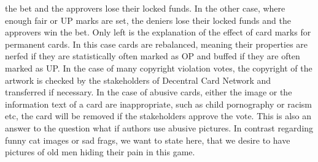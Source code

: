 \documentclass{article}
\begin{document}
the bet and the approvers lose their locked funds. In the other case, where enough fair or UP marks are set, the deniers lose their locked funds and the approvers win the bet. Only left is the explanation of the effect of card marks for permanent cards. In this case cards are rebalanced, meaning their properties are nerfed if they are statistically often marked as OP and buffed if they are often marked as UP. In the case of many copyright violation votes, the copyright of the artwork is checked by the stakeholders of Decentral Card Network and transferred if necessary. In the case of abusive cards, either the image or the information text of a card are inappropriate, such as child pornography or racism etc, the card will be removed if the stakeholders approve the vote. This is also an answer to the question what if authors use abusive pictures. In contrast regarding funny cat images or sad frags, we want to state here, that we desire to have pictures of old men hiding their pain in this game.
%
\end{document}
